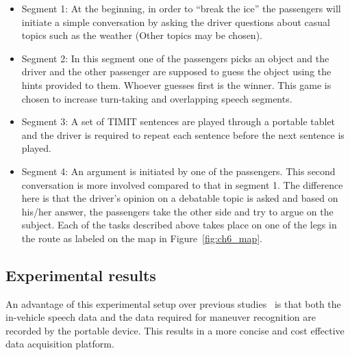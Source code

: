 \begin{itemize}
	
	\item Segment 1: At the beginning, in order to “break the ice” the passengers will initiate a simple conversation by asking the driver questions about casual topics such as the weather (Other topics may be chosen).
	\item Segment 2: In this segment one of the passengers picks an object and the driver and the other passenger are supposed to guess the object using the hints provided to them. Whoever guesses first is the winner. This game is chosen to increase turn-taking and overlapping speech segments.
	\item Segment 3: A set of TIMIT sentences are played through a portable tablet and the driver is required to repeat each sentence before the next sentence is played.
	\item Segment 4: An argument is initiated by one of the passengers. This second conversation is more involved compared to that in segment 1. The difference here is that the driver’s opinion on a debatable topic is asked and based on his/her answer, the passengers take the other side and try to argue on the subject.
	Each of the tasks described above takes place on one of the legs in the route as labeled on the map in Figure~\ref{fig:ch6_map}.
	
\end{itemize}




\subsection{Experimental results}
An advantage of this experimental setup over previous studies~\cite{sathyanarayanaITSC2012, sathyanarayanaSAE2013,ESPA} is that both the in-vehicle speech data and the data required for maneuver recognition are recorded by the portable device. 
This results in a more concise and cost effective data acquisition platform.

